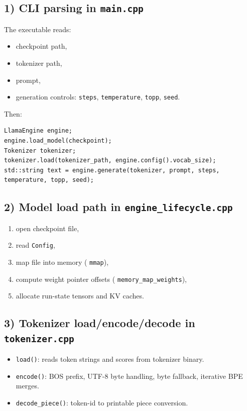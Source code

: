 \documentclass[11pt]{article}
\begin{document}
\subsection{1) CLI parsing in \texttt{main.cpp}}
The executable reads:
\begin{itemize}[leftmargin=*]
  \item checkpoint path,
  \item tokenizer path,
  \item prompt,
  \item generation controls: \texttt{steps}, \texttt{temperature}, \texttt{topp}, \texttt{seed}.
\end{itemize}
Then:
\begin{lstlisting}[style=code]
LlamaEngine engine;
engine.load_model(checkpoint);
Tokenizer tokenizer;
tokenizer.load(tokenizer_path, engine.config().vocab_size);
std::string text = engine.generate(tokenizer, prompt, steps, temperature, topp, seed);
\end{lstlisting}

\subsection{2) Model load path in \texttt{engine\_lifecycle.cpp}}
\begin{enumerate}[leftmargin=*]
  \item open checkpoint file,
  \item read \texttt{Config},
  \item map file into memory (
\texttt{mmap}),
  \item compute weight pointer offsets (
\texttt{memory\_map\_weights}),
  \item allocate run-state tensors and KV caches.
\end{enumerate}

\subsection{3) Tokenizer load/encode/decode in \texttt{tokenizer.cpp}}
\begin{itemize}[leftmargin=*]
  \item \texttt{load()}: reads token strings and scores from tokenizer binary.
  \item \texttt{encode()}: BOS prefix, UTF-8 byte handling, byte fallback, iterative BPE merges.
  \item \texttt{decode\_piece()}: token-id to printable piece conversion.
\end{itemize}
\end{document}
